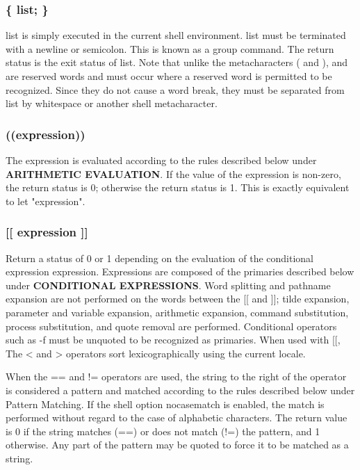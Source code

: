 \subsubsection*{\{ list; \}}
list is simply executed in the current shell environment. list must be terminated with a newline or semicolon. This is known as a group command. The return status is the exit status of list. Note that unlike the metacharacters ( and ), { and } are reserved words and must occur where a reserved word is permitted to be recognized. Since they do not cause a word break, they must be separated from list by whitespace or another shell metacharacter.
\subsubsection*{((expression))}
The expression is evaluated according to the rules described below under \textbf{ARITHMETIC EVALUATION}. If the value of the expression is non-zero, the return status is 0; otherwise the return status is 1. This is exactly equivalent to let "expression".
\subsubsection*{[[ expression ]]}
Return a status of 0 or 1 depending on the evaluation of the conditional expression expression. Expressions are composed of the primaries described below under \textbf{CONDITIONAL EXPRESSIONS}. Word splitting and pathname expansion are not performed on the words between the [[ and ]]; tilde expansion, parameter and variable expansion, arithmetic expansion, command substitution, process substitution, and quote removal are performed. Conditional operators such as -f must be unquoted to be recognized as primaries.
When used with [[, The < and > operators sort lexicographically using the current locale.

When the == and != operators are used, the string to the right of the operator is considered a pattern and matched according to the rules described below under Pattern Matching. If the shell option nocasematch is enabled, the match is performed without regard to the case of alphabetic characters. The return value is 0 if the string matches (==) or does not match (!=) the pattern, and 1 otherwise. Any part of the pattern may be quoted to force it to be matched as a string.

